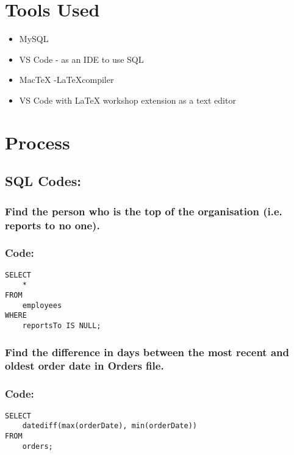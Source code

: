 \documentclass[12pt]{article}
\title{}
\author{}
\date{}
\begin{document}

\pagebreak

\tableofcontents

\maketitle

\section{Tools Used}
\begin{itemize}
    \item MySQL
    \item VS Code - as an IDE to use SQL
    \item MacTeX -\LaTeX  compiler
    \item VS Code with LaTeX workshop extension as a text editor
\end{itemize}


\section{Process}

\subsection*{SQL Codes:}
\subsubsection{Find the person who is the top of the organisation (i.e. reports to no one).}
\subsubsection*{Code:}
\begin{verbatim}
SELECT
    *
FROM
    employees
WHERE
    reportsTo IS NULL;
\end{verbatim}
\vspace{10mm}

\subsubsection{Find the difference in days between the most recent and oldest order date in Orders file.}
\subsubsection*{Code: }
\begin{verbatim}
SELECT
    datediff(max(orderDate), min(orderDate))
FROM
    orders;
\end{verbatim}
\end{document}
